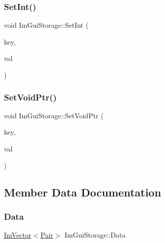 \hypertarget{struct_im_gui_storage_af83975ca841a9bd0e06a6ea0a41bf159}{}\label{struct_im_gui_storage_af83975ca841a9bd0e06a6ea0a41bf159} 
\subsubsection{\texorpdfstring{Set\+Int()}{SetInt()}}
{\footnotesize\ttfamily void Im\+Gui\+Storage\+::\+Set\+Int (\begin{DoxyParamCaption}\item[{Im\+Gui\+ID}]{key,  }\item[{int}]{val }\end{DoxyParamCaption})}

\hypertarget{struct_im_gui_storage_a55f840086b3ec9cf63c67f02d159204a}{}\label{struct_im_gui_storage_a55f840086b3ec9cf63c67f02d159204a} 
\subsubsection{\texorpdfstring{Set\+Void\+Ptr()}{SetVoidPtr()}}
{\footnotesize\ttfamily void Im\+Gui\+Storage\+::\+Set\+Void\+Ptr (\begin{DoxyParamCaption}\item[{Im\+Gui\+ID}]{key,  }\item[{void $\ast$}]{val }\end{DoxyParamCaption})}



\subsection{Member Data Documentation}
\hypertarget{struct_im_gui_storage_aab0b9789fac598a34c500459259fde42}{}\label{struct_im_gui_storage_aab0b9789fac598a34c500459259fde42} 
\subsubsection{\texorpdfstring{Data}{Data}}
{\footnotesize\ttfamily \hyperlink{class_im_vector}{Im\+Vector}$<$\hyperlink{struct_im_gui_storage_1_1_pair}{Pair}$>$ Im\+Gui\+Storage\+::\+Data}


